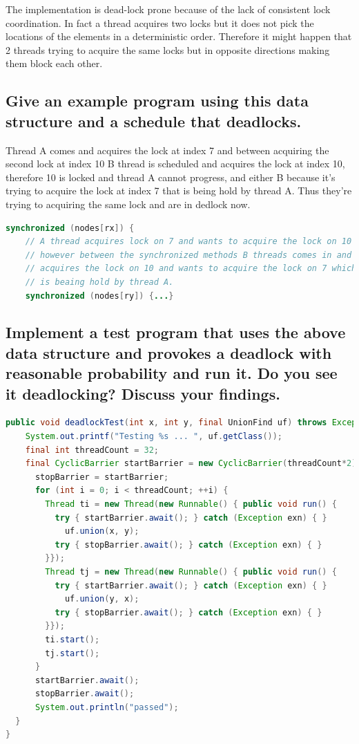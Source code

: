 \documentclass[format=acmsmall, review=false, screen=true]{acmart}
\begin{document}
The implementation is dead-lock prone because of the lack of consistent lock coordination.
In fact a thread acquires two locks but it does not pick the locations of the elements in a deterministic order. Therefore it might happen that 2 threads trying to acquire the same locks but in opposite directions making them block each other.

\subsection{Give an example program using this data structure and a schedule that deadlocks.}

Thread A comes and acquires the lock at index 7 and between acquiring the second lock at index 10 B thread is scheduled and acquires the lock at index 10, therefore 10 is locked and thread A cannot progress, and either B because it's trying to acquire the lock at index 7 that is being hold by thread A. Thus they're trying to acquiring the same lock and are in dedlock now.

\begin{lstlisting}[language=java]
synchronized (nodes[rx]) {
    // A thread acquires lock on 7 and wants to acquire the lock on 10
    // however between the synchronized methods B threads comes in and
    // acquires the lock on 10 and wants to acquire the lock on 7 which
    // is beaing hold by thread A.
    synchronized (nodes[ry]) {...}
\end{lstlisting}

\subsection{Implement a test program that uses the above data structure and provokes a deadlock with reasonable probability and run it. Do you see it deadlocking? Discuss your findings.}

\begin{lstlisting}[language=java]
  public void deadlockTest(int x, int y, final UnionFind uf) throws Exception {
    System.out.printf("Testing %s ... ", uf.getClass());
    final int threadCount = 32;
    final CyclicBarrier startBarrier = new CyclicBarrier(threadCount*2),
      stopBarrier = startBarrier;
      for (int i = 0; i < threadCount; ++i) {
        Thread ti = new Thread(new Runnable() { public void run() {
          try { startBarrier.await(); } catch (Exception exn) { }
            uf.union(x, y);
          try { stopBarrier.await(); } catch (Exception exn) { }
        }});
        Thread tj = new Thread(new Runnable() { public void run() {
          try { startBarrier.await(); } catch (Exception exn) { }
            uf.union(y, x);
          try { stopBarrier.await(); } catch (Exception exn) { }
        }});
        ti.start();
        tj.start();
      }
      startBarrier.await();
      stopBarrier.await();
      System.out.println("passed");
  }
}
\end{lstlisting}
\end{document}
